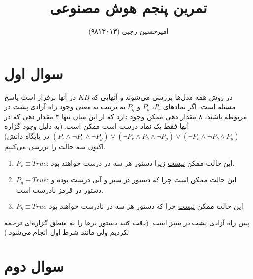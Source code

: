 \documentclass{article}
\title{
	تمرین پنجم هوش مصنوعی
}
\author{
	امیرحسین رجبی (۹۸۱۳۰۱۳)
}
\begin{document}
	\maketitle
	
	\section*{
	سوال اول
	}
	در روش 
	همه مدل‌ها بررسی می‌شوند و آنهایی که $KB$ در آنها برقرار است پاسخ مسئله است. اگر نماد‌های $P_r$، $P_b$  و $P_g$ به ترتیب به معنی وجود راه آزادی پشت در مربوطه باشند، ۸ مقدار دهی ممکن وجود دارد که از این میان تنها ۳ مقدار دهی که در آنها فقط یک نماد درست است ممکن است. (به دلیل وجود گزاره 
	$(P_r \wedge \neg P_b \wedge \neg P_g) \vee (\neg P_r \wedge  P_b \wedge \neg P_g) \vee (\neg P_r \wedge \neg P_b \wedge  P_g)$
	در پایگاه دانش)
	اکنون سه حالت را بررسی می‌کنیم. 
	\begin{enumerate}
		\item 
		$P_r \equiv True$:
		این حالت ممکن \underline{نیست} زیرا دستور هر سه در درست خواهند بود.
		\item 
		$P_g \equiv True$:
		این حالت ممکن \underline{است} چرا که دستور در سبز و آبی درست بوده و دستور در قرمز نادرست است.
		\item 
		$P_b \equiv True$
		این حالت ممکن \underline{نیست} چرا که دستور هر سه در نادرست خواهند بود.
	\end{enumerate}

	پس راه آزادی پشت در سبز است. (دقت کنید دستور درها را به منطق گزاره‌ای ترجمه نکردیم ولی مانند شرط اول انجام می‌شود.)
	\section*{
	سوال دوم
	}
\end{document}
